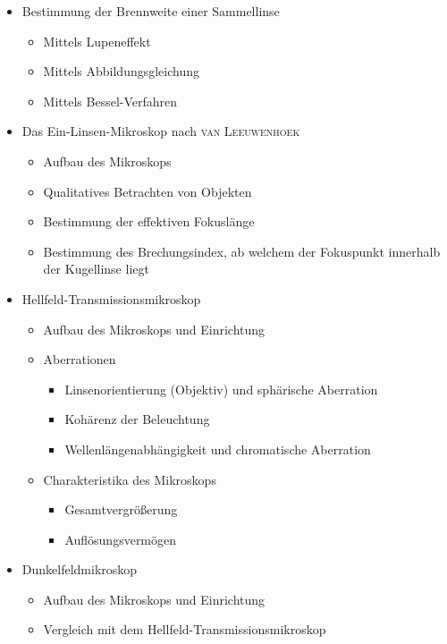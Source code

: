 \documentclass[english, ngerman]{scrartcl}
\begin{document}
\begin{itemize}
    \item Bestimmung der Brennweite einer Sammellinse
          \begin{itemize}
              \item Mittels Lupeneffekt
              \item Mittels Abbildungsgleichung
              \item Mittels Bessel-Verfahren
          \end{itemize}
    \item Das Ein-Linsen-Mikroskop nach \textsc{van Leeuwenhoek}
          \begin{itemize}
              \item Aufbau des Mikroskops
              \item Qualitatives Betrachten von Objekten
              \item Bestimmung der effektiven Fokuslänge
              \item Bestimmung des Brechungsindex, ab welchem der Fokuspunkt innerhalb der Kugellinse liegt
          \end{itemize}
    \item Hellfeld-Transmissionsmikroskop
          \begin{itemize}
              \item Aufbau des Mikroskops und Einrichtung
              \item Aberrationen
                    \begin{itemize}
                        \item Linsenorientierung (Objektiv) und sphärische Aberration
                        \item Kohärenz der Beleuchtung
                        \item Wellenlängenabhängigkeit und chromatische Aberration
                    \end{itemize}
              \item Charakteristika des Mikroskops
                    \begin{itemize}
                        \item Gesamtvergrößerung
                        \item Auflösungsvermögen
                    \end{itemize}
          \end{itemize}
    \item Dunkelfeldmikroskop
          \begin{itemize}
              \item Aufbau des Mikroskops und Einrichtung
              \item Vergleich mit dem Hellfeld-Transmissionsmikroskop
          \end{itemize}
\end{itemize}
\end{document}
